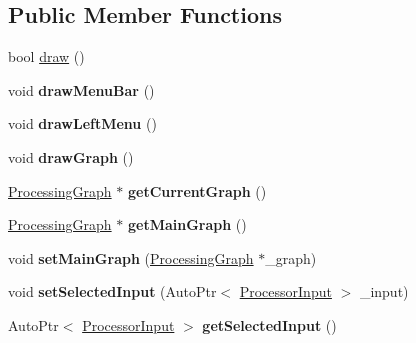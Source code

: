 \subsection*{Public Member Functions}
\begin{DoxyCompactItemize}
\item 
bool \mbox{\hyperlink{class_chill_1_1_node_editor_a7b67d5473c93d3258a2dc565e76da024}{draw}} ()
\item 
\mbox{\label{class_chill_1_1_node_editor_a3670fbd563c836d91e0df519471e3c60}} 
void {\bfseries draw\+Menu\+Bar} ()
\item 
\mbox{\label{class_chill_1_1_node_editor_a2119a9f6e2041ba91deb36a1b45a8e13}} 
void {\bfseries draw\+Left\+Menu} ()
\item 
\mbox{\label{class_chill_1_1_node_editor_ae5938466153e88151b86f71e42019007}} 
void {\bfseries draw\+Graph} ()
\item 
\mbox{\label{class_chill_1_1_node_editor_ae16b6f9169e6be3c66b0bbb16d98478e}} 
\mbox{\hyperlink{class_chill_1_1_processing_graph}{Processing\+Graph}} $\ast$ {\bfseries get\+Current\+Graph} ()
\item 
\mbox{\label{class_chill_1_1_node_editor_ac4ce7407055b993d07acc52be4c0d7d4}} 
\mbox{\hyperlink{class_chill_1_1_processing_graph}{Processing\+Graph}} $\ast$ {\bfseries get\+Main\+Graph} ()
\item 
\mbox{\label{class_chill_1_1_node_editor_afb0b4e46c302e32949fe910a395f768d}} 
void {\bfseries set\+Main\+Graph} (\mbox{\hyperlink{class_chill_1_1_processing_graph}{Processing\+Graph}} $\ast$\+\_\+graph)
\item 
\mbox{\label{class_chill_1_1_node_editor_ad97dd216359065bab711ccb8f9085998}} 
void {\bfseries set\+Selected\+Input} (Auto\+Ptr$<$ \mbox{\hyperlink{class_chill_1_1_processor_input}{Processor\+Input}} $>$ \+\_\+input)
\item 
\mbox{\label{class_chill_1_1_node_editor_aa6e12a25a6abc55d4a5b2350f73f5c21}} 
Auto\+Ptr$<$ \mbox{\hyperlink{class_chill_1_1_processor_input}{Processor\+Input}} $>$ {\bfseries get\+Selected\+Input} ()

\end{DoxyCompactItemize}

